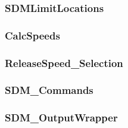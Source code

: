 \subsubsection{SDMLimitLocations}


\subsubsection{CalcSpeeds}


\subsubsection{ReleaseSpeed\_Selection}


\subsubsection{SDM\_Commands}


\subsubsection{SDM\_OutputWrapper}

